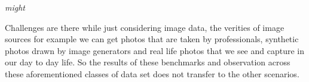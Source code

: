 {\em might\/} 

Challenges are there while just considering image data, 
the verities of image sources for example we can get photos that are taken by 
professionals, synthetic photos drawn by image generators and real life photos 
that we see and capture in our day to day life. So the results of these benchmarks and 
observation across these aforementioned classes of data set does not transfer to the other scenarios.